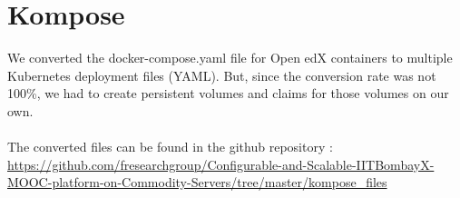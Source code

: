 \documentclass[12pt]{report}
\begin{document}
\section{Kompose}
We converted the docker-compose.yaml file for Open edX containers to multiple Kubernetes deployment files (YAML). But, since the conversion rate was not 100\%, we had to create persistent volumes and claims for those volumes on our own.\\\\
The converted files can be found in the github repository : \\ \href{https://github.com/fresearchgroup/Configurable-and-Scalable-IITBombayX-MOOC-platform-on-Commodity-Servers/tree/master/kompose_files}{https://github.com/fresearchgroup/Configurable-and-Scalable-IITBombayX-MOOC-platform-on-Commodity-Servers/tree/master/kompose\_files} \cite{Komposefiles}
\end{document}
